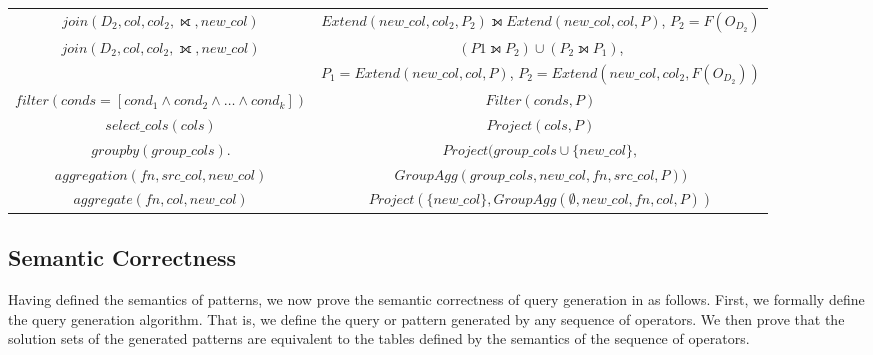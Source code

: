 \begin{table}[th!]
\begin{tabular}{ |c|c| }
        $join(D_2, col, col_2, \rightouterjoin, new\_col)$ & $Extend(new\_col, col_2, P_2) \leftouterjoin Extend(new\_col, col, P) $, $P_2 = F(O_{D_2})$\\
        $join(D_2, col, col_2, \fullouterjoin, new\_col)$ & $(P1 \leftouterjoin P_2) \cup (P_2 \leftouterjoin P_1)$, \\
        & $P_1 = Extend(new\_col, col, P)$, $P_2 = Extend(new\_col, col_2, F(O_{D_2})) $\\
               \hline
        $filter(conds = [cond_1 \land cond_2 \land \dots \land cond_k])$ & $Filter(conds, P)$\\
        \hline
        $select\_cols(cols)$ & $Project(cols, P)$\\
        \hline
        $groupby(group\_cols).$ & $Project(group\_cols \cup \{new\_col\}, $\\ 
        $aggregation(fn, src\_col, new\_col)$& $GroupAgg(group\_cols, new\_col, fn, src\_col, P))$ \\
        \hline
        $aggregate(fn, col, new\_col)$ & $Project(\{ new\_col \}, GroupAgg(\emptyset, new\_col, fn, col, P))$ \\
        \hline
    \end{tabular}
\end{table}

\vspace*{-4pt}
\subsection{Semantic Correctness}
\label{subsec:correctness}

Having defined the semantics of \sparql patterns, we now prove the semantic correctness of query generation in \rdfframes as follows.
First, we formally define the \sparql query generation algorithm. That is, we define the \sparql query or pattern generated by any sequence of \rdfframes operators. We then  prove that the solution sets of the generated \sparql patterns are equivalent to the \rdfframes tables defined by the semantics of the sequence of \rdfframes operators.


